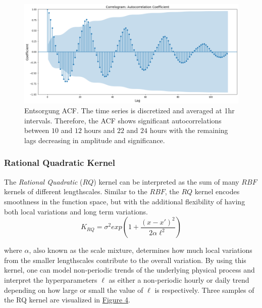 \begin{figure}[htp]
\centering
\graphicspath{ {./images/} }
\includegraphics[scale=0.49]{images/entsorgung_acf.png}
\caption{Entsorgung ACF. The time series is discretized and averaged at 1hr intervals. Therefore, the ACF shows significant autocorrelations between $10$ and $12$ hours and $22$ and $24$ hours with the remaining lags decreasing in amplitude and significance.}
\end{figure}

\subsubsection{Rational Quadratic Kernel}

The \textit{Rational Quadratic} ($RQ$) kernel can be interpreted as the sum of many $RBF$ kernels of different lengthscales. Similar to the $RBF$, the $RQ$ kernel encodes smoothness in the function space, but with the additional flexibility of having both local variations and long term variations. 
\begin{equation}
    K_{RQ} = \sigma^2 exp(1 + \frac{(x - x')^2}{2\alpha \ell^2})
\end{equation}

where $\alpha$, also known as the scale mixture, determines how much local variations from the smaller lengthscales contribute to the overall variation. By using this kernel, one can model non-periodic trends of the underlying physical process and interpret the hyperparameters $\ell$ as either a non-periodic hourly or daily trend depending on how large or small the value of $\ell$ is respectively. Three samples of the RQ kernel are visualized in \hyperlink{figure.4}{Figure 4}.

